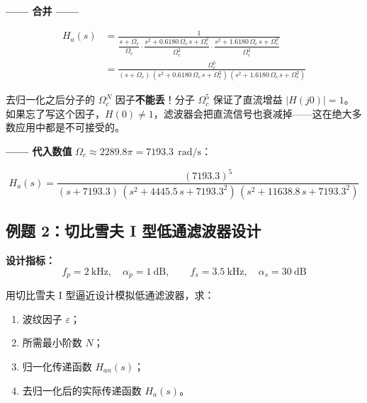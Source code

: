 \documentclass[12pt,a4paper]{ctexart}
\newcommand{\Omegac}{\Omega_c}
\newcommand{\db}{\ \mathrm{dB}}
\newcommand{\rads}{\ \mathrm{rad/s}}
\newcommand{\Han}{H_{\!a}(s)}
\newcommand{\HanNorm}{H_{\!an}(s)}
\begin{document}
\textbf{—— 合并 ——}

\begin{align*}
\Han &= \frac{1}
    {\dfrac{s + \Omegac}{\Omegac}
     \cdot \dfrac{s^2 + 0.6180\,\Omegac\,s + \Omegac^2}{\Omegac^2}
     \cdot \dfrac{s^2 + 1.6180\,\Omegac\,s + \Omegac^2}{\Omegac^2}} \\[8pt]
    &= \frac{\Omegac^5}
       {(s + \Omegac)\,
        (s^2 + 0.6180\,\Omegac\,s + \Omegac^2)\,
        (s^2 + 1.6180\,\Omegac\,s + \Omegac^2)}
\end{align*}

\begin{pitfall}
去归一化之后分子的 $\Omegac^N$ 因子\textbf{不能丢}！分子 $\Omegac^5$ 保证了直流增益 $|H(j0)| = 1$。如果忘了写这个因子，$H(0) \neq 1$，滤波器会把直流信号也衰减掉——这在绝大多数应用中都是不可接受的。
\end{pitfall}

\textbf{—— 代入数值 }$\Omegac \approx 2289.8\pi = 7193.3\ \rads$：

\[
\boxed{\displaystyle
\Han = \frac{(7193.3)^5}
    {(s + 7193.3)\,
    (s^2 + 4445.5\,s + 7193.3^2)\,
    (s^2 + 11638.8\,s + 7193.3^2)}
}
\]



\newpage
\subsection{例题 2：切比雪夫 I 型低通滤波器设计}

\begin{tcolorbox}[enhanced, colback=white, colframe=chebyshev!60,
    title={\textbf{题目}}, fonttitle=\bfseries, sharp corners, breakable]

\textbf{设计指标：}
\[
f_p = 2\ \mathrm{kHz},\quad \alpha_p = 1\db,\qquad
f_s = 3.5\ \mathrm{kHz},\quad \alpha_s = 30\db
\]

用切比雪夫 I 型逼近设计模拟低通滤波器，求：
\begin{enumerate}[label=(\arabic*)]
    \item 波纹因子 $\varepsilon$；
    \item 所需最小阶数 $N$；
    \item 归一化传递函数 $\HanNorm$；
    \item 去归一化后的实际传递函数 $\Han$。
\end{enumerate}
\end{tcolorbox}
\end{document}
